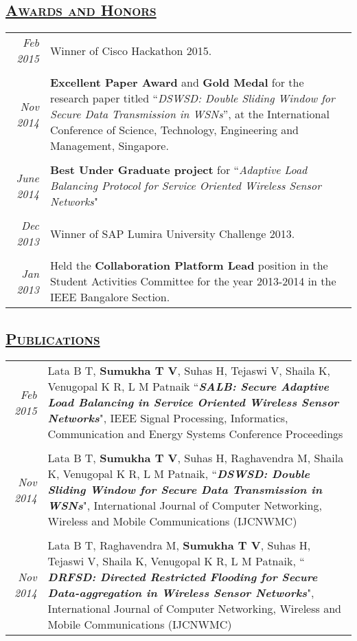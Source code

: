 \documentclass[14pt]{article}
\begin{document}
\subsection* {\scshape\LARGE\uline {Awards and Honors}}
\begin{tabularx}{\textwidth}{r X}
\emph{Feb 2015} & Winner of Cisco Hackathon 2015. \\ \\
\emph{Nov 2014} & \textbf{Excellent Paper Award} and \textbf{Gold Medal} for the research paper  titled ``\emph{DSWSD: Double Sliding Window for Secure Data Transmission in WSNs}'', at the International Conference of Science, Technology, Engineering and Management, Singapore. \\ \\
\emph{June 2014} & \textbf{Best Under Graduate project} for ``\emph{Adaptive Load Balancing Protocol for Service Oriented Wireless Sensor Networks}" \\ \\
\emph{Dec 2013} & Winner of SAP Lumira University Challenge 2013. \\ \\
\emph{Jan 2013} & Held the \textbf{Collaboration Platform Lead} position in the Student Activities Committee for the year 2013-2014 in the IEEE Bangalore Section. 
\end{tabularx}

\subsection* {\scshape\LARGE\uline {Publications}}
\begin{tabularx}{\textwidth}{r X}
\emph{Feb 2015} & Lata B T, \textbf{Sumukha T V}, Suhas H, Tejaswi V, Shaila K, Venugopal K R, L M Patnaik ``\textbf{\textit{SALB: Secure Adaptive Load 		         Balancing in Service Oriented Wireless Sensor Networks}}",  IEEE Signal Processing, Informatics, Communication and Energy Systems Conference Proceedings \\ \\
\emph{Nov 2014} & Lata B T, \textbf{Sumukha T V}, Suhas H, Raghavendra M, Shaila K, Venugopal K R, L M Patnaik, ``\textbf{\textit{DSWSD: Double Sliding Window for Secure Data Transmission in WSNs}}", International Journal of Computer Networking, Wireless and Mobile Communications (IJCNWMC) \\ \\
\emph{Nov 2014} & Lata B T, Raghavendra M,  \textbf{Sumukha T V}, Suhas H, Tejaswi V, Shaila K, Venugopal K R, L M Patnaik, `` \textbf{\textit{DRFSD: Directed Restricted Flooding for Secure Data-aggregation in Wireless Sensor Networks}}", International Journal of Computer Networking, Wireless and Mobile Communications (IJCNWMC)
\end{tabularx}
\end{document}
